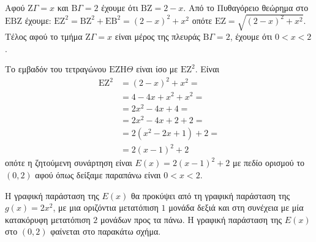 \begin{alist}
\item Αφού $\text{Z}\Gamma = x$ και $\text{B}\Gamma = 2$ έχουμε ότι $\text{BZ} = 2 - x$. Από το Πυθαγόρειο θεώρημα στο $\text{EBZ}$ έχουμε: $\text{EZ}^2 = \text{BZ}^2 + \text{EB}^2 = (2-x)^2 + x^2$ οπότε $\text{EZ} = \sqrt{(2-x)^2+x^2}$. Τέλος αφού το τμήμα $\text{Z}\Gamma = x$ είναι μέρος της πλευράς $\text{B}\Gamma = 2$, έχουμε ότι $0 < x < 2$.
\item Το εμβαδόν του τετραγώνου $\text{EZH}\Theta$ είναι ίσο με $\text{EZ}^2$. Είναι
\begin{align*}
\text{EZ}^2 &= (2-x)^2 + x^2 = \\
&= 4 - 4x + x^2 + x^2 = \\
&= 2x^2 - 4x + 4 = \\
&= 2x^2 - 4x + 2 + 2 = \\
&= 2(x^2 - 2x + 1) + 2 = \\
&= 2(x-1)^2 + 2
\end{align*}
οπότε η ζητούμενη συνάρτηση είναι $E(x) = 2(x-1)^2 + 2$ με πεδίο ορισμού το $(0, 2)$ αφού όπως δείξαμε παραπάνω είναι $0 < x < 2$.
\item Η γραφική παράσταση της $E(x)$ θα προκύψει από τη γραφική παράσταση της $g(x) = 2x^2$, με μια οριζόντια μετατόπιση $1$ μονάδα δεξιά και στη συνέχεια με μία κατακόρυφη μετατόπιση $2$ μονάδων προς τα πάνω. Η γραφική παράσταση της $E(x)$ στο $(0, 2)$ φαίνεται στο παρακάτω σχήμα.
\end{alist}

